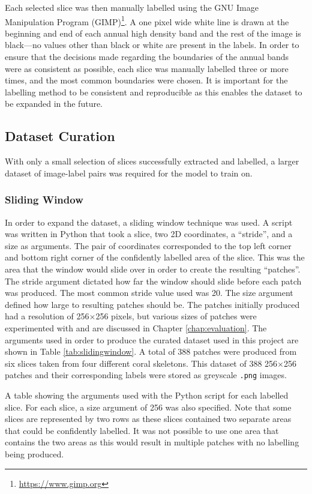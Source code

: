 Each selected slice was then manually labelled using the GNU Image Manipulation Program (GIMP)\footnote{\url{https://www.gimp.org}}. A one pixel wide white line is drawn at the beginning and end of each annual high density band and the rest of the image is black---no values other than black or white are present in the labels. In order to ensure that the decisions made regarding the boundaries of the annual bands were as consistent as possible, each slice was manually labelled three or more times, and the most common boundaries were chosen. It is important for the labelling method to be consistent and reproducible as this enables the dataset to be expanded in the future.

\subsection{Dataset Curation}
\label{sec:datasetcuration}

With only a small selection of slices successfully extracted and labelled, a larger dataset of image-label pairs was required for the model to train on.

\subsubsection{Sliding Window}

In order to expand the dataset, a sliding window technique was used. A script was written in Python that took a slice, two 2D coordinates, a ``stride'', and a size as arguments. The pair of coordinates corresponded to the top left corner and bottom right corner of the confidently labelled area of the slice. This was the area that the window would slide over in order to create the resulting ``patches''. The stride argument dictated how far the window should slide before each patch was produced. The most common stride value used was 20. The size argument defined how large to resulting patches should be. The patches initially produced had a resolution of 256$\times$256 pixels, but various sizes of patches were experimented with and are discussed in Chapter \ref{chap:evaluation}. The arguments used in order to produce the curated dataset used in this project are shown in Table \ref{tab:slidingwindow}. A total of 388 patches were produced from six slices taken from four different coral skeletons. This dataset of 388 256$\times$256 patches and their corresponding labels were stored as greyscale \texttt{.png} images.

\begin{table}[t]
\centering
\caption{A table showing the arguments used with the Python script for each labelled slice. For each slice, a size argument of 256 was also specified. Note that some slices are represented by two rows as these slices contained two separate areas that could be confidently labelled. It was not possible to use one area that contains the two areas as this would result in multiple patches with no labelling being produced.}

\label{tab:slidingwindow}
\end{table}

